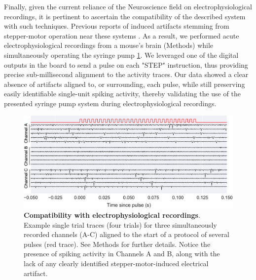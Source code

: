 Finally, given the current reliance of the Neuroscience field on electrophysiological recordings, it is pertinent to ascertain the compatibility of the described system with such techniques. Previous reports of induced artifacts stemming from stepper-motor operation near these systems \citep{Amarante2019}. As a result, we performed acute electrophysiological recordings from a mouse's brain (Methods) while simultaneously operating the syringe pump \ref{fig:Ephys}. 
We leveraged one of the digital outputs in the board to send a pulse on each "STEP" instruction, thus providing precise sub-millisecond alignment to the activity traces. 
Our data showed a clear absence of artifacts aligned to, or surrounding, each pulse, while still preserving easily identifiable single-unit spiking activity, thereby validating the use of the presented syringe pump system during electrophysiological recordings.

\begin{figure}[ht] 
	\centering
	\includegraphics[width=1.0\linewidth]{Figures/Artboard 7.pdf}
	\caption{\textbf{Compatibility with electrophysiological recordings}.\\
	Example single trial traces (four trials) for three simultaneously recorded channels (A-C) aligned to the start of a protocol of several pulses (red trace). See Methods for further details. Notice the presence of spiking activity in Channels A and B, along with the lack of any clearly identified stepper-motor-induced electrical artifact.}	
	\label{fig:Ephys}
\end{figure}




